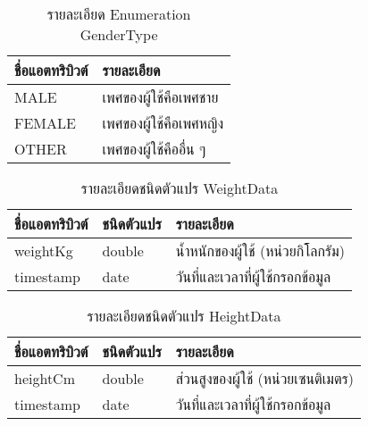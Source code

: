 \begin{table}
    \caption{รายละเอียด Enumeration GenderType}
    \begin{tabularx}{\textwidth}{ | l | X | }
        \hline
        \bf ชื่อแอตทริบิวต์ & \bf รายละเอียด \\\hline
        MALE & เพศของผู้ใช้คือเพศชาย\\\hline
        FEMALE & เพศของผู้ใช้คือเพศหญิง\\\hline
        OTHER & เพศของผู้ใช้คืออื่น ๆ\\\hline
    \end{tabularx}
\end{table}

\begin{table}
    \caption{รายละเอียดชนิดตัวแปร WeightData}
    \begin{tabularx}{\textwidth}{ | l | l | X | }
        \hline
        \bf ชื่อแอตทริบิวต์ & \bf ชนิดตัวแปร & \bf รายละเอียด \\\hline
        weightKg & double & น้ำหนักของผู้ใช้ (หน่วยกิโลกรัม)\\\hline
        timestamp & date & วันที่และเวลาที่ผู้ใช้กรอกข้อมูล\\\hline
    \end{tabularx}
\end{table}

\begin{table}
    \caption{รายละเอียดชนิดตัวแปร HeightData}
    \begin{tabularx}{\textwidth}{ | l | l | X | }
        \hline
        \bf ชื่อแอตทริบิวต์ & \bf ชนิดตัวแปร & \bf รายละเอียด \\\hline
        heightCm & double & ส่วนสูงของผู้ใช้ (หน่วยเซนติเมตร)\\\hline
        timestamp & date & วันที่และเวลาที่ผู้ใช้กรอกข้อมูล\\\hline
    \end{tabularx}
\end{table}

